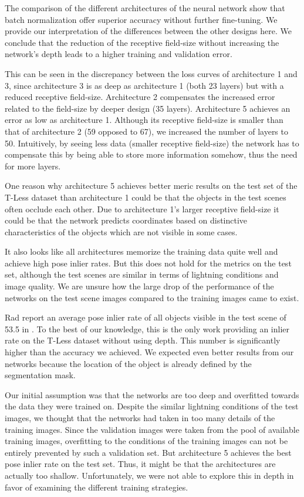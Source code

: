 The comparison of the different architectures of the neural network show that batch normalization offer superior accuracy without further fine-tuning. We provide our interpretation of the differences between the other designs here. We conclude that the reduction of the receptive field-size without increasing the network's depth leads to a higher training and validation error. 

This can be seen in the discrepancy between the loss curves of architecture 1 and 3, since architecture 3 is as deep as architecture 1 (both 23 layers) but with a reduced receptive field-size. Architecture 2 compensates the increased error related to the field-size by deeper design (35 layers). Architecture 5 achieves an error as low as architecture 1. Although its receptive field-size is smaller than that of architecture 2 (59 opposed to 67), we increased the number of layers to 50. Intuitively, by seeing less data (smaller receptive field-size) the network has to compensate this by being able to store more information somehow, thus the need for more layers.

One reason why architecture 5 achieves better meric results on the test set of the T-Less dataset than architecture 1 could be that the objects in the test scenes often occlude each other. Due to architecture 1's larger receptive field-size it could be that the network predicts coordinates based on distinctive characteristics of the objects which are not visible in some cases. 

It also looks like all architectures memorize the training data quite well and achieve high pose inlier rates. But this does not hold for the metrics on the test set, although the test scenes are similar in terms of lightning conditions and image quality. We are unsure how the large drop of the performance of the networks on the test scene images compared to the training images came to exist.

Rad \etal report an average pose inlier rate of all objects visible in the test scene of 53.5 in \cite{bb8}. To the best of our knowledge, this is the only work providing an inlier rate on the T-Less dataset without using depth. This number is significantly higher than the accuracy we achieved. We expected even better results from our networks because the location of the object is already defined by the segmentation mask. 

Our initial assumption was that the networks are too deep and overfitted towards the data they were trained on. Despite the similar lightning conditions of the test images, we thought that the networks had taken in too many details of the training images. Since the validation images were taken from the pool of available training images, overfitting to the conditions of the training images can not be entirely prevented by such a validation set. But architecture 5 achieves the best pose inlier rate on the test set. Thus, it might be that the architectures are actually too shallow. Unfortunately, we were not able to explore this in depth in favor of examining the different training strategies.

